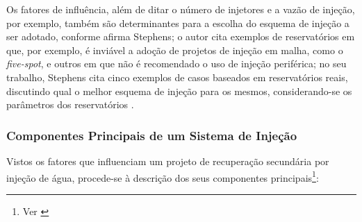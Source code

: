 Os fatores de influ\^{e}ncia, al\'{e}m de ditar o n\'{u}mero de injetores e a vaz\~{a}o de inje\c{c}\~{a}o, por exemplo, tamb\'{e}m s\~{a}o determinantes para a escolha do esquema de inje\c{c}\~{a}o a ser adotado, conforme afirma Stephens; o autor cita exemplos de reservat\'{o}rios em que, por exemplo, \'{e} invi\'{a}vel a ado\c{c}\~{a}o de projetos de inje\c{c}\~{a}o em malha, como o \textit{five-spot}, e outros em que n\~{a}o \'{e} recomendado o uso de inje\c{c}\~{a}o perif\'{e}rica; no seu trabalho, Stephens cita cinco exemplos de casos baseados em reservat\'{o}rios reais, discutindo qual o melhor esquema de inje\c{c}\~{a}o para os mesmos, considerando-se os par\^{a}metros dos reservat\'{o}rios \cite{stephens1960}.

\subsubsection{Componentes Principais de um Sistema de Inje\c{c}\~{a}o}

Vistos os fatores que influenciam um projeto de recupera\c{c}\~{a}o secund\'{a}ria por inje\c{c}\~{a}o de \'{a}gua, procede-se \`{a} descri\c{c}\~{a}o dos seus componentes principais\footnote{Ver \cite[pp. 653-659]{engres}}:

